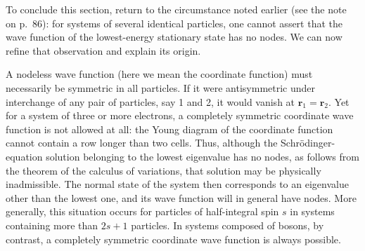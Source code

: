 To conclude this section, return to the circumstance noted earlier (see the note on p.~86): for systems of several identical particles, one cannot assert that the wave function of the lowest-energy stationary state has no nodes. We can now refine that observation and explain its origin.

A nodeless wave function (here we mean the coordinate function) must necessarily be symmetric in all particles. If it were antisymmetric under interchange of any pair of particles, say 1 and 2, it would vanish at $\mathbf r_1=\mathbf r_2$. Yet for a system of three or more electrons, a completely symmetric coordinate wave function is not allowed at all: the Young diagram of the coordinate function cannot contain a row longer than two cells. Thus, although the Schrödinger-equation solution belonging to the lowest eigenvalue has no nodes, as follows from the theorem of the calculus of variations, that solution may be physically inadmissible. The normal state of the system then corresponds to an eigenvalue other than the lowest one, and its wave function will in general have nodes. More generally, this situation occurs for particles of half-integral spin $s$ in systems containing more than $2s+1$ particles. In systems composed of bosons, by contrast, a completely symmetric coordinate wave function is always possible.
